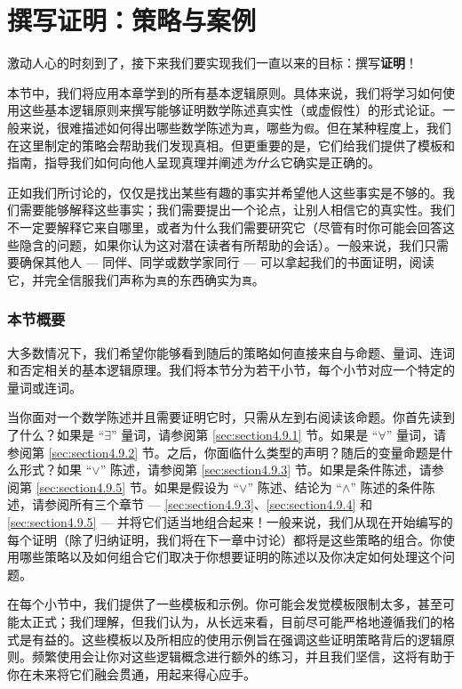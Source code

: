 \section{撰写证明：策略与案例}

激动人心的时刻到了，接下来我们要实现我们一直以来的目标：撰写\textbf{证明}！

本节中，我们将应用本章学到的所有基本逻辑原则。具体来说，我们将学习如何使用这些基本逻辑原则来撰写能够证明数学陈述真实性（或虚假性）的形式论证。一般来说，很难描述如何得出哪些数学陈述为\verb|真|，哪些为\verb|假|。但在某种程度上，我们在这里制定的策略会帮助我们发现真相。但更重要的是，它们给我们提供了模板和指南，指导我们如何向他人呈现真理并阐述\emph{为什么}它确实是正确的。

正如我们所讨论的，仅仅是找出某些有趣的事实并希望他人这些事实是不够的。我们需要能够解释这些事实；我们需要提出一个论点，让别人相信它的真实性。我们不一定要解释它来自哪里，或者为什么我们需要研究它（尽管有时你可能会回答这些隐含的问题，如果你认为这对潜在读者有所帮助的会话）。一般来说，我们只需要确保其他人 --- 同伴、同学或数学家同行 --- 可以拿起我们的书面证明，阅读它，并完全信服我们声称为\verb|真|的东西确实为\verb|真|。

\subsubsection*{本节概要}

大多数情况下，我们希望你能够看到随后的策略如何直接来自与命题、量词、连词和否定相关的基本逻辑原理。我们将本节分为若干小节，每个小节对应一个特定的量词或连词。

当你面对一个数学陈述并且需要证明它时，只需从左到右阅读该命题。你首先读到了什么？如果是 ``$\exists$'' 量词，请参阅第 \ref{sec:section4.9.1} 节。如果是 ``$\forall$'' 量词，请参阅第 \ref{sec:section4.9.2} 节。之后，你面临什么类型的声明？随后的变量命题是什么形式？如果 ``$\lor$'' 陈述，请参阅第 \ref{sec:section4.9.3} 节。如果是条件陈述，请参阅第 \ref{sec:section4.9.5} 节。如果是假设为 ``$\lor$'' 陈述、结论为 ``$\land$'' 陈述的条件陈述，请参阅所有三个章节 --- \ref{sec:section4.9.3}、\ref{sec:section4.9.4} 和 \ref{sec:section4.9.5} --- 并将它们适当地组合起来！一般来说，我们从现在开始编写的每个证明（除了归纳证明，我们将在下一章中讨论）都将是这些策略的组合。你使用哪些策略以及如何组合它们取决于你想要证明的陈述以及你决定如何处理这个问题。

在每个小节中，我们提供了一些模板和示例。你可能会发觉模板限制太多，甚至可能太正式；我们理解，但我们认为，从长远来看，目前尽可能严格地遵循我们的格式是有益的。这些模板以及所相应的使用示例旨在强调这些证明策略背后的逻辑原则。频繁使用会让你对这些逻辑概念进行额外的练习，并且我们坚信，这将有助于你在未来将它们融会贯通，用起来得心应手。

